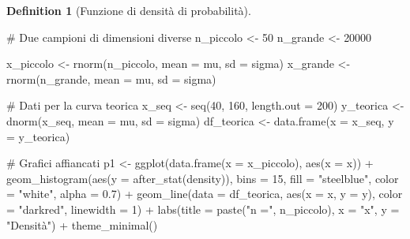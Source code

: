 \documentclass[
  letterpaper,
  DIV=11,
  numbers=noendperiod,
  oneside]{scrreprt}
\newenvironment{Shaded}{\begin{snugshade}}{\end{snugshade}}
\newcommand{\AttributeTok}[1]{\textcolor[rgb]{0.40,0.45,0.13}{#1}}
\newcommand{\CommentTok}[1]{\textcolor[rgb]{0.37,0.37,0.37}{#1}}
\newcommand{\DecValTok}[1]{\textcolor[rgb]{0.68,0.00,0.00}{#1}}
\newcommand{\FloatTok}[1]{\textcolor[rgb]{0.68,0.00,0.00}{#1}}
\newcommand{\FunctionTok}[1]{\textcolor[rgb]{0.28,0.35,0.67}{#1}}
\newcommand{\NormalTok}[1]{\textcolor[rgb]{0.00,0.23,0.31}{#1}}
\newcommand{\OtherTok}[1]{\textcolor[rgb]{0.00,0.23,0.31}{#1}}
\newcommand{\SpecialCharTok}[1]{\textcolor[rgb]{0.37,0.37,0.37}{#1}}
\newcommand{\StringTok}[1]{\textcolor[rgb]{0.13,0.47,0.30}{#1}}
\theoremstyle{definition}
\theoremstyle{plain}
\theoremstyle{definition}
\newtheorem{definition}{Definition}[chapter]
\theoremstyle{remark}
\begin{document}
\begin{definition}[Funzione di densità di
probabilità]
\begin{Shaded}
\begin{Highlighting}[]
\CommentTok{\# Due campioni di dimensioni diverse}
\NormalTok{n\_piccolo }\OtherTok{\textless{}{-}} \DecValTok{50}
\NormalTok{n\_grande }\OtherTok{\textless{}{-}} \DecValTok{20000}

\NormalTok{x\_piccolo }\OtherTok{\textless{}{-}} \FunctionTok{rnorm}\NormalTok{(n\_piccolo, }\AttributeTok{mean =}\NormalTok{ mu, }\AttributeTok{sd =}\NormalTok{ sigma)}
\NormalTok{x\_grande }\OtherTok{\textless{}{-}} \FunctionTok{rnorm}\NormalTok{(n\_grande, }\AttributeTok{mean =}\NormalTok{ mu, }\AttributeTok{sd =}\NormalTok{ sigma)}

\CommentTok{\# Dati per la curva teorica}
\NormalTok{x\_seq }\OtherTok{\textless{}{-}} \FunctionTok{seq}\NormalTok{(}\DecValTok{40}\NormalTok{, }\DecValTok{160}\NormalTok{, }\AttributeTok{length.out =} \DecValTok{200}\NormalTok{)}
\NormalTok{y\_teorica }\OtherTok{\textless{}{-}} \FunctionTok{dnorm}\NormalTok{(x\_seq, }\AttributeTok{mean =}\NormalTok{ mu, }\AttributeTok{sd =}\NormalTok{ sigma)}
\NormalTok{df\_teorica }\OtherTok{\textless{}{-}} \FunctionTok{data.frame}\NormalTok{(}\AttributeTok{x =}\NormalTok{ x\_seq, }\AttributeTok{y =}\NormalTok{ y\_teorica)}

\CommentTok{\# Grafici affiancati}
\NormalTok{p1 }\OtherTok{\textless{}{-}} \FunctionTok{ggplot}\NormalTok{(}\FunctionTok{data.frame}\NormalTok{(}\AttributeTok{x =}\NormalTok{ x\_piccolo), }\FunctionTok{aes}\NormalTok{(}\AttributeTok{x =}\NormalTok{ x)) }\SpecialCharTok{+}
  \FunctionTok{geom\_histogram}\NormalTok{(}\FunctionTok{aes}\NormalTok{(}\AttributeTok{y =} \FunctionTok{after\_stat}\NormalTok{(density)), }\AttributeTok{bins =} \DecValTok{15}\NormalTok{, }
                 \AttributeTok{fill =} \StringTok{"steelblue"}\NormalTok{, }\AttributeTok{color =} \StringTok{"white"}\NormalTok{, }\AttributeTok{alpha =} \FloatTok{0.7}\NormalTok{) }\SpecialCharTok{+}
  \FunctionTok{geom\_line}\NormalTok{(}\AttributeTok{data =}\NormalTok{ df\_teorica, }\FunctionTok{aes}\NormalTok{(}\AttributeTok{x =}\NormalTok{ x, }\AttributeTok{y =}\NormalTok{ y), }
            \AttributeTok{color =} \StringTok{"darkred"}\NormalTok{, }\AttributeTok{linewidth =} \DecValTok{1}\NormalTok{) }\SpecialCharTok{+}
  \FunctionTok{labs}\NormalTok{(}\AttributeTok{title =} \FunctionTok{paste}\NormalTok{(}\StringTok{"n ="}\NormalTok{, n\_piccolo), }\AttributeTok{x =} \StringTok{"x"}\NormalTok{, }\AttributeTok{y =} \StringTok{"Densità"}\NormalTok{) }\SpecialCharTok{+}
  \FunctionTok{theme\_minimal}\NormalTok{()}


\end{Highlighting}
\end{Shaded}
\end{definition}
\end{document}
